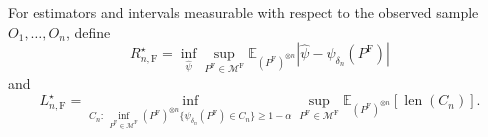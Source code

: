 For estimators and intervals measurable with respect to the observed sample \(O_1,\ldots,O_n\), define
\[
 R_{n,\mathrm F}^\star=\inf_{\widehat\psi}\sup_{P^{\mathrm F}\in\mathcal M^{\mathrm F}}
 \mathbb E_{(P^{\mathrm F})^{\otimes n}}|\widehat\psi-\psi_{\delta_n}(P^{\mathrm F})|
\]
and
\[
 L_{n,\mathrm F}^\star=
 \inf_{C_n:\,\inf_{P^{\mathrm F}\in\mathcal M^{\mathrm F}}
 (P^{\mathrm F})^{\otimes n}\{\psi_{\delta_n}(P^{\mathrm F})\in C_n\}\geq1-\alpha}
 \sup_{P^{\mathrm F}\in\mathcal M^{\mathrm F}}
 \mathbb E_{(P^{\mathrm F})^{\otimes n}}[\operatorname{len}(C_n)].
\]